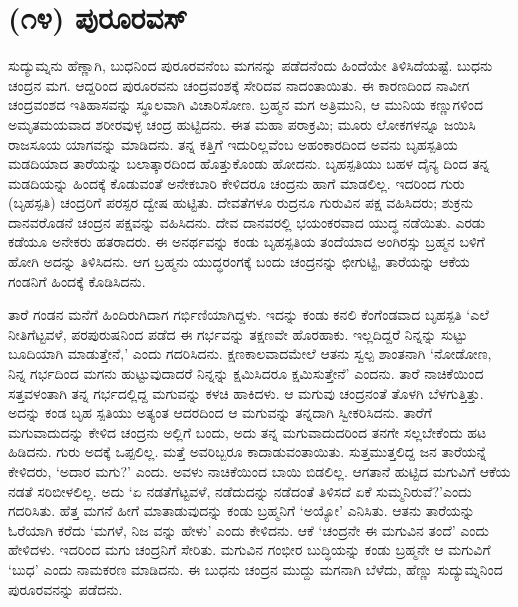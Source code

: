\section{(೧೪) ಪುರೂರವಸ್}

ಸುದ್ಯುಮ್ನನು ಹೆಣ್ಣಾಗಿ, ಬುಧನಿಂದ ಪುರೂರವನೆಂಬ ಮಗನನ್ನು ಪಡೆದನೆಂದು ಹಿಂದೆಯೇ ತಿಳಿಸಿದೆಯಷ್ಟೆ. ಬುಧನು ಚಂದ್ರನ ಮಗ. ಆದ್ದರಿಂದ ಪುರೂರವನು ಚಂದ್ರವಂಶಕ್ಕೆ ಸೇರಿದವ ನಾದಂತಾಯಿತು. ಈ ಕಾರಣದಿಂದ ನಾವೀಗ ಚಂದ್ರವಂಶದ ಇತಿಹಾಸವನ್ನು ಸ್ಥೂಲವಾಗಿ ವಿಚಾರಿಸೋಣ. ಬ್ರಹ್ಮನ ಮಗ ಅತ್ರಿಮುನಿ, ಆ ಮುನಿಯ ಕಣ್ಣುಗಳಿಂದ ಅಮೃತಮಯವಾದ ಶರೀರವುಳ್ಳ ಚಂದ್ರ ಹುಟ್ಟಿದನು. ಈತ ಮಹಾ ಪರಾಕ್ರಮಿ; ಮೂರು ಲೋಕಗಳನ್ನೂ ಜಯಿಸಿ ರಾಜಸೂಯ ಯಾಗವನ್ನು ಮಾಡಿದನು. ತನ್ನ ಕತ್ತಿಗೆ ಇದುರಿಲ್ಲವೆಂಬ ಅಹಂಕಾರದಿಂದ ಅವನು ಬೃಹಸ್ಪತಿಯ ಮಡದಿಯಾದ ತಾರೆಯನ್ನು ಬಲಾತ್ಕಾರದಿಂದ ಹೊತ್ತುಕೊಂಡು ಹೋದನು. ಬೃಹಸ್ಪತಿಯು ಬಹಳ ದೈನ್ಯ ದಿಂದ ತನ್ನ ಮಡದಿಯನ್ನು ಹಿಂದಕ್ಕೆ ಕೊಡುವಂತೆ ಅನೇಕಬಾರಿ ಕೇಳಿದರೂ ಚಂದ್ರನು ಹಾಗೆ ಮಾಡಲಿಲ್ಲ. ಇದರಿಂದ ಗುರು (ಬೃಹಸ್ಪತಿ) ಚಂದ್ರರಿಗೆ ಪರಸ್ಪರ ದ್ವೇಷ ಹುಟ್ಟಿತು. ದೇವತೆಗಳೂ ರುದ್ರನೂ ಗುರುವಿನ ಪಕ್ಷ ವಹಿಸಿದರು; ಶುಕ್ರನು ದಾನವರೊಡನೆ ಚಂದ್ರನ ಪಕ್ಷವನ್ನು ವಹಿಸಿದನು. ದೇವ ದಾನವರಲ್ಲಿ ಭಯಂಕರವಾದ ಯುದ್ಧ ನಡೆಯಿತು. ಎರಡು ಕಡೆಯೂ ಅನೇಕರು ಹತರಾದರು. ಈ ಅನರ್ಥವನ್ನು ಕಂಡು ಬೃಹಸ್ಪತಿಯ ತಂದೆಯಾದ ಅಂಗಿರಸ್ಸು ಬ್ರಹ್ಮನ ಬಳಿಗೆ ಹೋಗಿ ಅದನ್ನು ತಿಳಿಸಿದನು. ಆಗ ಬ್ರಹ್ಮನು ಯುದ್ಧರಂಗಕ್ಕೆ ಬಂದು ಚಂದ್ರನನ್ನು ಛೀಗುಟ್ಟಿ, ತಾರೆಯನ್ನು ಆಕೆಯ ಗಂಡನಿಗೆ ಹಿಂದಕ್ಕೆ ಕೊಡಿಸಿದನು.

 ತಾರೆ ಗಂಡನ ಮನೆಗೆ ಹಿಂದಿರುಗಿದಾಗ ಗರ್ಭಿಣಿಯಾಗಿದ್ದಳು. ಇದನ್ನು ಕಂಡು ಕನಲಿ ಕೆಂಗೆಂಡವಾದ ಬೃಹಸ್ಪತಿ ‘ಎಲೆ ನೀತಿಗೆಟ್ಟವಳೆ, ಪರಪುರುಷನಿಂದ ಪಡೆದ ಈ ಗರ್ಭವನ್ನು ತಕ್ಷಣವೇ ಹೊರಹಾಕು. ಇಲ್ಲದಿದ್ದರೆ ನಿನ್ನನ್ನು ಸುಟ್ಟು ಬೂದಿಯಾಗಿ ಮಾಡುತ್ತೇನೆ,’ ಎಂದು ಗದರಿಸಿದನು. ಕ್ಷಣಕಾಲವಾದಮೇಲೆ ಆತನು ಸ್ವಲ್ಪ ಶಾಂತನಾಗಿ ‘ನೋಡೋಣ, ನಿನ್ನ ಗರ್ಭದಿಂದ ಮಗನು ಹುಟ್ಟುವುದಾದರೆ ನಿನ್ನನ್ನು ಕ್ಷಮಿಸಿದರೂ ಕ್ಷಮಿಸುತ್ತೇನೆ’ ಎಂದನು. ತಾರೆ ನಾಚಿಕೆಯಿಂದ ಸತ್ತವಳಂತಾಗಿ ತನ್ನ ಗರ್ಭದಲ್ಲಿದ್ದ ಮಗುವನ್ನು ಕಳಚಿ ಹಾಕಿದಳು. ಆ ಮಗುವು ಚಂದ್ರನಂತೆ ತೊಳಗಿ ಬೆಳಗುತ್ತಿತ್ತು. ಅದನ್ನು ಕಂಡ ಬೃಹ ಸ್ಪತಿಯು ಅತ್ಯಂತ ಆದರದಿಂದ ಆ ಮಗುವನ್ನು ತನ್ನದಾಗಿ ಸ್ವೀಕರಿಸಿದನು. ತಾರೆಗೆ ಮಗುವಾದುದನ್ನು ಕೇಳಿದ ಚಂದ್ರನು ಅಲ್ಲಿಗೆ ಬಂದು, ಅದು ತನ್ನ ಮಗುವಾದುದರಿಂದ ತನಗೇ ಸಲ್ಲಬೇಕೆಂದು ಹಟ ಹಿಡಿದನು. ಗುರು ಅದಕ್ಕೆ ಒಪ್ಪಲಿಲ್ಲ. ಮತ್ತೆ ಅವರಿಬ್ಬರೂ ಕಾದಾಡುವಂತಾಯಿತು. ಸುತ್ತಮುತ್ತಲಿದ್ದ ಜನ ತಾರೆಯನ್ನೆ ಕೇಳಿದರು, ‘ಅದಾರ ಮಗು?’ ಎಂದು. ಅವಳು ನಾಚಿಕೆಯಿಂದ ಬಾಯಿ ಬಿಡಲಿಲ್ಲ. ಆಗತಾನೆ ಹುಟ್ಟಿದ ಮಗುವಿಗೆ ಆಕೆಯ ನಡತೆ ಸರಿಬೀಳಲಿಲ್ಲ. ಅದು ‘ಏ ನಡತೆಗೆಟ್ಟವಳೆ, ನಡೆದುದನ್ನು ನಡೆದಂತೆ ತಿಳಿಸದೆ ಏಕೆ ಸುಮ್ಮನಿರುವೆ?’ಎಂದು ಗದರಿಸಿತು. ಹೆತ್ತ ಮಗನೆ ಹೀಗೆ ಮಾತಾಡುವುದನ್ನು ಕಂಡು ಬ್ರಹ್ಮನಿಗೆ ‘ಅಯ್ಯೋ’ ಎನಿಸಿತು. ಆತನು ತಾರೆಯನ್ನು ಓರೆಯಾಗಿ ಕರೆದು ‘ಮಗಳೆ, ನಿಜ ವನ್ನು ಹೇಳು’ ಎಂದು ಕೇಳಿದನು. ಆಕೆ ‘ಚಂದ್ರನೇ ಈ ಮಗುವಿನ ತಂದೆ’ ಎಂದು ಹೇಳಿದಳು. ಇದರಿಂದ ಮಗು ಚಂದ್ರನಿಗೆ ಸೇರಿತು. ಮಗುವಿನ ಗಂಭೀರ ಬುದ್ಧಿಯನ್ನು ಕಂಡು ಬ್ರಹ್ಮನೇ ಆ ಮಗುವಿಗೆ ‘ಬುಧ’ ಎಂದು ನಾಮಕರಣ ಮಾಡಿದನು. ಈ ಬುಧನು ಚಂದ್ರನ ಮುದ್ದು ಮಗನಾಗಿ ಬೆಳೆದು, ಹೆಣ್ಣು ಸುದ್ಯುಮ್ನನಿಂದ ಪುರೂರವನನ್ನು ಪಡೆದನು.

